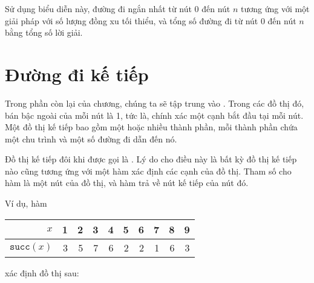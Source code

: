 Sử dụng biểu diễn này,
đường đi ngắn nhất từ nút 0 đến nút $n$
tương ứng với một giải pháp với số lượng đồng xu tối thiểu,
và tổng số đường đi từ nút 0 đến nút $n$
bằng tổng số lời giải.

\section{Đường đi kế tiếp}


Trong phần còn lại của chương,
chúng ta sẽ tập trung vào .
Trong các đồ thị đó,
bán bậc ngoài của mỗi nút là 1, tức là,
chính xác một cạnh bắt đầu tại mỗi nút.
Một đồ thị kế tiếp bao gồm một hoặc nhiều
thành phần, mỗi thành phần chứa
một chu trình và một số đường đi dẫn đến nó.

Đồ thị kế tiếp đôi khi được gọi là
.
Lý do cho điều này là bất kỳ đồ thị kế tiếp nào
cũng tương ứng với một hàm xác định
các cạnh của đồ thị.
Tham số cho hàm là một nút của đồ thị,
và hàm trả về nút kế tiếp của nút đó.

Ví dụ, hàm
\begin{center}
\begin{tabular}{r|rrrrrrrrr}
$x$ & 1 & 2 & 3 & 4 & 5 & 6 & 7 & 8 & 9 \\
\hline
$\texttt{succ}(x)$ & 3 & 5 & 7 & 6 & 2 & 2 & 1 & 6 & 3 \\
\end{tabular}
\end{center}
xác định đồ thị sau:
\begin{center}
\end{center}

